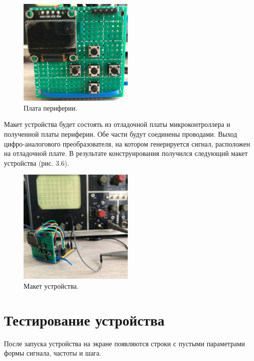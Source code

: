 	\begin{figure}[H]
    \centering
    \includegraphics[width=0.5\textwidth]{../image/m1.jpeg}
    \caption{Плата периферии.}
	\end{figure}	
	
	Макет устройства будет состоять из отладочной платы микроконтроллера и полученной платы периферии. Обе части будут соединены проводами. Выход цифро-аналогового преобразователя, на котором генерируется сигнал, расположен на отладочной плате. В результате конструирования получился следующий макет устройства (рис. 3.6).

	\begin{figure}[H]
    \centering
    \includegraphics[width=0.5\textwidth]{../image/m2.jpg}
    \caption{Макет устройства.}
	\end{figure}	

\section{Тестирование устройства}
	
	После запуска устройства на экране появляются строки с пустыми параметрами формы сигнала, частоты и шага.

